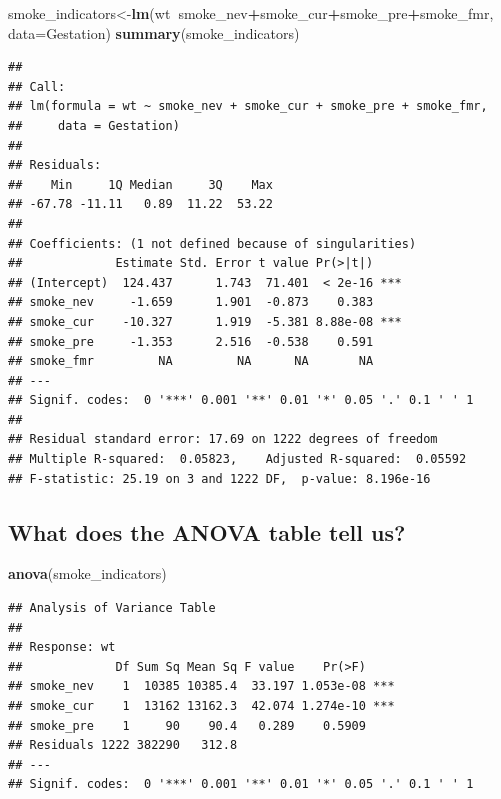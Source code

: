 \documentclass[]{article}
\newenvironment{Shaded}{\begin{snugshade}}{\end{snugshade}}
\newcommand{\DataTypeTok}[1]{\textcolor[rgb]{0.13,0.29,0.53}{#1}}
\newcommand{\KeywordTok}[1]{\textcolor[rgb]{0.13,0.29,0.53}{\textbf{#1}}}
\newcommand{\NormalTok}[1]{#1}
\newcommand{\OperatorTok}[1]{\textcolor[rgb]{0.81,0.36,0.00}{\textbf{#1}}}
\begin{document}
\begin{Shaded}
\begin{Highlighting}[]
\NormalTok{smoke_indicators<-}\KeywordTok{lm}\NormalTok{(wt}\OperatorTok{~}\NormalTok{smoke_nev}\OperatorTok{+}\NormalTok{smoke_cur}\OperatorTok{+}\NormalTok{smoke_pre}\OperatorTok{+}\NormalTok{smoke_fmr, }\DataTypeTok{data=}\NormalTok{Gestation)}
\KeywordTok{summary}\NormalTok{(smoke_indicators)}
\end{Highlighting}
\end{Shaded}

\begin{verbatim}
## 
## Call:
## lm(formula = wt ~ smoke_nev + smoke_cur + smoke_pre + smoke_fmr, 
##     data = Gestation)
## 
## Residuals:
##    Min     1Q Median     3Q    Max 
## -67.78 -11.11   0.89  11.22  53.22 
## 
## Coefficients: (1 not defined because of singularities)
##             Estimate Std. Error t value Pr(>|t|)    
## (Intercept)  124.437      1.743  71.401  < 2e-16 ***
## smoke_nev     -1.659      1.901  -0.873    0.383    
## smoke_cur    -10.327      1.919  -5.381 8.88e-08 ***
## smoke_pre     -1.353      2.516  -0.538    0.591    
## smoke_fmr         NA         NA      NA       NA    
## ---
## Signif. codes:  0 '***' 0.001 '**' 0.01 '*' 0.05 '.' 0.1 ' ' 1
## 
## Residual standard error: 17.69 on 1222 degrees of freedom
## Multiple R-squared:  0.05823,    Adjusted R-squared:  0.05592 
## F-statistic: 25.19 on 3 and 1222 DF,  p-value: 8.196e-16
\end{verbatim}

\newpage

\hypertarget{what-does-the-anova-table-tell-us}{%
\subsection{What does the ANOVA table tell
us?}\label{what-does-the-anova-table-tell-us}}

\begin{Shaded}
\begin{Highlighting}[]
\KeywordTok{anova}\NormalTok{(smoke_indicators)}
\end{Highlighting}
\end{Shaded}

\begin{verbatim}
## Analysis of Variance Table
## 
## Response: wt
##             Df Sum Sq Mean Sq F value    Pr(>F)    
## smoke_nev    1  10385 10385.4  33.197 1.053e-08 ***
## smoke_cur    1  13162 13162.3  42.074 1.274e-10 ***
## smoke_pre    1     90    90.4   0.289    0.5909    
## Residuals 1222 382290   312.8                      
## ---
## Signif. codes:  0 '***' 0.001 '**' 0.01 '*' 0.05 '.' 0.1 ' ' 1
\end{verbatim}
\end{document}
